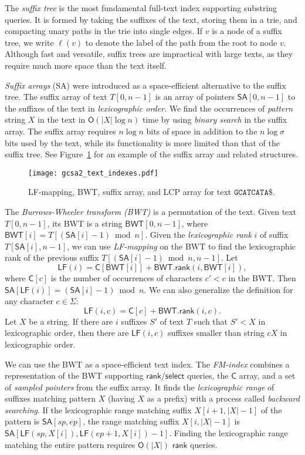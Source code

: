 \documentclass[a4paper,UKenglish]{lipics-v2016}
\newcommand{\abs}[1]{\ensuremath{\lvert #1 \rvert}}
\newcommand{\Oh}[1]{\ensuremath{\mathsf{O}\!\left( #1 \right)}}
\newcommand{\dnaseq}[1]{\ensuremath{\mathtt{#1}}}
\newcommand{\rank}{\ensuremath{\mathsf{rank}}}
\newcommand{\select}{\ensuremath{\mathsf{select}}}
\newcommand{\LF}{\ensuremath{\mathsf{LF}}}
\newcommand{\LFmapping}{LF\nobreakdash-mapping}
\newcommand{\FMindex}{FM\nobreakdash-index}
\newcommand{\SA}{\ensuremath{\mathsf{SA}}}
\newcommand{\BWT}{\ensuremath{\mathsf{BWT}}}
\newcommand{\Carray}{\ensuremath{\mathsf{C}}}
\begin{document}
The \emph{suffix tree} \cite{Weiner1973} is the most fundamental full-text index supporting substring queries. It is formed by taking the suffixes of the text, storing them in a trie, and compacting unary paths in the trie into single edges. If $v$ is a node of a suffix tree, we write $\ell(v)$ to denote the label of the path from the root to node $v$. Although fast and versatile, suffix trees are impractical with large texts, as they require much more space than the text itself.

\emph{Suffix arrays} (SA) \cite{Manber1993} were introduced as a space-efficient alternative to the suffix tree. The suffix array of text $T[0, n-1]$ is an array of pointers $\SA[0, n-1]$ to the suffixes of the text in \emph{lexicographic order}. We find the occurrences of \emph{pattern} string $X$ in the text in $\Oh{\abs{X} \log n}$ time by using \emph{binary search} in the suffix array. The suffix array requires $n \log n$ bits of space in addition to the $n \log \sigma$ bits used by the text, while its functionality is more limited than that of the suffix tree. See Figure~\ref{figure:indexes} for an example of the suffix array and related structures.

\begin{figure}[t!]
\texttt{[image: gcsa2\_text\_indexes.pdf]}
\caption{\LFmapping, BWT, suffix array, and LCP array for text $\dnaseq{GCATCATA}\$$.}\label{figure:indexes}
\end{figure}

The \emph{Burrows-Wheeler transform (BWT)} \cite{Burrows1994} is a permutation of the text. Given text $T[0, n-1]$, its BWT is a string $\BWT[0, n-1]$, where $\BWT[i] = T[(\SA[i]-1) \bmod n]$. Given the \emph{lexicographic rank} $i$ of suffix $T[\SA[i], n-1]$, we can use \emph{\LFmapping} on the BWT to find the lexicographic rank of the previous suffix $T[(\SA[i]-1) \bmod n, n-1]$. Let
$$
\LF(i) = \Carray[\BWT[i]] + \BWT.\rank(i, \BWT[i]),
$$
where $\Carray[c]$ is the number of occurrences of characters $c' < c$ in the BWT. Then $\SA[\LF(i)] = (\SA[i]-1) \bmod n$. We can also generalize the definition for any character $c \in \Sigma$:
$$
\LF(i, c) = \Carray[c] + \BWT.\rank(i, c).
$$
Let $X$ be a string. If there are $i$ suffixes $S'$ of text $T$ such that $S' < X$ in lexicographic order, then there are $\LF(i, c)$ suffixes smaller than string $cX$ in lexicographic order.

We can use the BWT as a space-efficient text index. The \emph{\FMindex} \cite{Ferragina2005a} combines a representation of the BWT supporting $\rank$/$\select$ queries, the $\Carray$ array, and a set of \emph{sampled pointers} from the suffix array. It finds the \emph{lexicographic range} of suffixes matching pattern $X$ (having $X$ as a prefix) with a process called \emph{backward searching}. If the lexicographic range matching suffix $X[i+1, \abs{X}-1]$ of the pattern is $\SA[sp, ep]$, the range matching suffix $X[i, \abs{X}-1]$ is $\SA[\LF(sp, X[i]), \LF(ep+1, X[i]) - 1]$. Finding the lexicographic range matching the entire pattern requires $\Oh{\abs{X}}$ $\rank$ queries.
\end{document}
